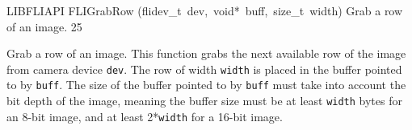 \documentclass{article}
\begin{document}
\begin{cxxfunction}
{LIBFLIAPI}
        {FLIGrabRow}
        {(flidev\_t\ dev,\ void*\ buff,\ size\_t\ width)}
        {
 Grab a row of an image.}
        {25}
\begin{cxxdoc}

Grab a row of an image.  This function grabs the next available row
of the image from camera device \texttt{dev}.  The row of width
\texttt{width} is placed in the buffer pointed to by \texttt{buff}.
The size of the buffer pointed to by \texttt{buff} must take into
account the bit depth of the image, meaning the buffer size must be
at least \texttt{width} bytes for an 8-bit image, and at least
2*\texttt{width} for a 16-bit image.


\end{cxxdoc}
\end{cxxfunction}
\end{document}
